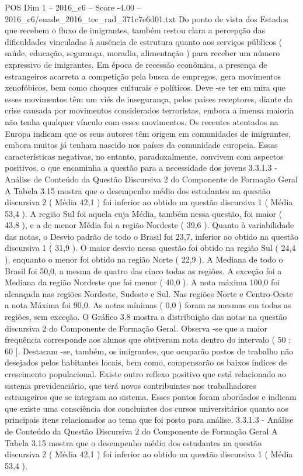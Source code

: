 \begin{textsample}{POS Dim 1 – 2016\_c6 – Score -4.00 – 2016\_c6/enade\_2016\_tec\_rad\_371c7e6d01.txt}
Do ponto de vista dos Estados que recebem o fluxo de imigrantes, também restou clara a percepção das dificuldades vinculadas à ausência de estrutura quanto aos serviços públicos ( saúde, educação, segurança, moradia, alimentação ) para receber um número expressivo de imigrantes.
Em época de recessão econômica, a presença de estrangeiros acarreta a competição pela busca de empregos, gera movimentos xenofóbicos, bem como choques culturais e políticos.
Deve -se ter em mira que esses movimentos têm um viés de insegurança, pelos países receptores, diante da crise causada por movimentos considerados terroristas, embora a imensa maioria não tenha qualquer vínculo com esses movimentos.
Os recentes atentados na Europa indicam que os seus autores têm origem em comunidades de imigrantes, embora muitos já tenham nascido nos países da comunidade europeia.
Essas características negativas, no entanto, paradoxalmente, convivem com aspectos positivos, o que encaminha a questão para a necessidade dos jovens 3.3.1.3 - Análise de Conteúdo da Questão Discursiva 2 do Componente de Formação Geral A Tabela 3.15 mostra que o desempenho médio dos estudantes na questão discursiva 2 ( Média 42,1 ) foi inferior ao obtido na questão discursiva 1 ( Média 53,4 ).
A região Sul foi aquela cuja Média, também nessa questão, foi maior ( 43,8 ), e a de menor Média foi a região Nordeste ( 39,6 ).
Quanto à variabilidade das notas, o Desvio padrão de todo o Brasil foi 23,7, inferior ao obtido na questão discursiva 1 ( 31,9 ).
O maior desvio nessa questão foi obtido na região Sul ( 24,4 ), enquanto o menor foi obtido na região Norte ( 22,9 ).
A Mediana de todo o Brasil foi 50,0, a mesma de quatro das cinco todas as regiões.
A exceção foi a Mediana da região Nordeste que foi menor ( 40,0 ).
A nota máxima 100,0 foi alcançada nas regiões Nordeste, Sudeste e Sul.
Nas regiões Norte e Centro-Oeste a nota Máxima foi 90,0.
As notas mínimas ( 0,0 ) foram as mesmas em todas as regiões, sem exceção.
O Gráfico 3.8 mostra a distribuição das notas na questão discursiva 2 do Componente de Formação Geral.
Observa -se que a maior frequência corresponde aos alunos que obtiveram nota dentro do intervalo ( 50 ; 60 ].
Destacam -se, também, os imigrantes, que ocuparão postos de trabalho não desejados pelos habitantes locais, bem como, compensarão os baixos índices de crescimento populacional.
Existe outro reflexo positivo que está relacionado ao sistema previdenciário, que terá novos contribuintes nos trabalhadores estrangeiros que se integram ao sistema.
Esses pontos foram abordados e indicam que existe uma consciência dos concluintes dos cursos universitários quanto aos principais itens relacionados ao tema que foi posto para análise. 3.3.1.3 - Análise de Conteúdo da Questão Discursiva 2 do Componente de Formação Geral A Tabela 3.15 mostra que o desempenho médio dos estudantes na questão discursiva 2 ( Média 42,1 ) foi inferior ao obtido na questão discursiva 1 ( Média 53,4 ).

\end{textsample}
